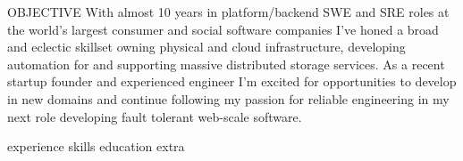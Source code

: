 \documentclass{resume}
\begin{document}

\begin{rSection}{OBJECTIVE}
{With almost 10 years in platform/backend SWE and SRE roles at the world's largest consumer and social software companies I've honed a broad and eclectic skillset owning physical and cloud infrastructure, developing automation for and supporting massive distributed storage services. As a recent startup founder and experienced engineer I'm excited for opportunities to develop in new domains and continue following my passion for reliable engineering in my next role developing fault tolerant web-scale software.}
\end{rSection}


{experience}
\newpage
{skills}
{education}
{extra}
\end{document}
